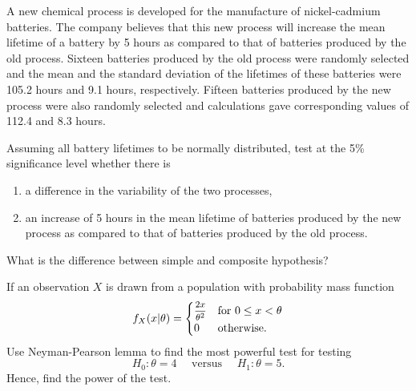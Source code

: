 \begin{mdframed}
    \begin{Exercise}
        A new chemical process is developed for the
        manufacture of nickel-cadmium batteries. The
        company believes that this new process will
        increase the mean lifetime of a battery by 5
        hours as compared to that of batteries produced
        by the old process. Sixteen batteries produced
        by the old process were randomly selected and
        the mean and the standard deviation of the
        lifetimes of these batteries were 105.2 hours and
        9.1 hours, respectively. Fifteen batteries
        produced by the new process were also randomly
        selected and calculations gave corresponding
        values of 112.4 and 8.3 hours.

        Assuming all battery lifetimes to be normally
        distributed, test at the 5\% significance level
        whether there is
        \begin{enumerate}
            \item a difference in the variability of the two
                processes,
            \item an increase of 5 hours in the mean lifetime of
                batteries produced by the new process as
                compared to that of batteries produced by the
                old process.
        \end{enumerate}
    \end{Exercise}

    \begin{Exercise}
        What is the difference between simple and composite hypothesis?
    \end{Exercise}

    \begin{Exercise}
        If an observation $X$ is drawn from a population with probability mass function
        \[
            f_X(x|\theta) = \begin{cases}
                \mfrac{2x}{\theta^2} & \text{for } 0 \leq x < \theta\\
                0 & \text{otherwise}.
            \end{cases}
        \]
        Use Neyman-Pearson lemma to find the most powerful test for testing
        \[
            H_0 : \theta = 4 \quad \text{ versus } \quad H_1 : \theta = 5.
        \]
        Hence, find the power of the test.
    \end{Exercise}


\end{mdframed}
